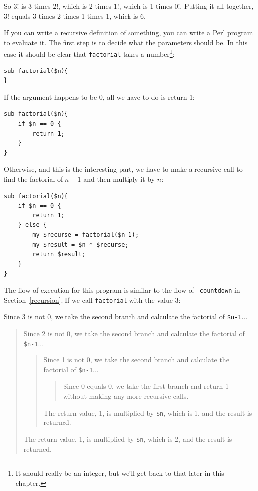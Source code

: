 So $3!$ is 3 times $2!$, which is 2 times $1!$, which is 1 times
$0!$. Putting it all together, $3!$ equals 3 times 2 times 1 times 1,
which is 6.

If you can write a recursive definition of something, you can
write a Perl program to evaluate it. The first step is to decide
what the parameters should be.  In this case it should be clear
that {\tt factorial} takes a number\footnote{It should really be an 
integer, but we'll get back to that later in this chapter.}:

\begin{verbatim}
sub factorial($n){
}
\end{verbatim}
%
If the argument happens to be 0, all we have to do is return 1:

\begin{verbatim}
sub factorial($n){
    if $n == 0 {
        return 1;
    }
}   
\end{verbatim}
%
Otherwise, and this is the interesting part, we have to make a
recursive call to find the factorial of $n-1$ and then 
multiply it by $n$:

\begin{verbatim}
sub factorial($n){
    if $n == 0 {
        return 1;
    } else {
        my $recurse = factorial($n-1);
        my $result = $n * $recurse;
        return $result;
    }
}
\end{verbatim}
%
The flow of execution for this program is similar to the flow of {\tt
countdown} in Section~\ref{recursion}.  If we call {\tt factorial}
with the value 3:

Since 3 is not 0, we take the second branch and calculate the factorial
of {\tt \$n-1}...

\begin{quote}
Since 2 is not 0, we take the second branch and calculate the factorial of
{\tt \$n-1}...


  \begin{quote}
  Since 1 is not 0, we take the second branch and calculate the factorial
  of {\tt \$n-1}...


    \begin{quote}
    Since 0 equals 0, we take the first branch and return 1
    without making any more recursive calls.
    \end{quote}


  The return value, 1, is multiplied by \verb'$n', which is 1, and the
  result is returned.
  \end{quote}


The return value, 1, is multiplied by \verb'$n', which is 2, and the
result is returned.
\end{quote}


